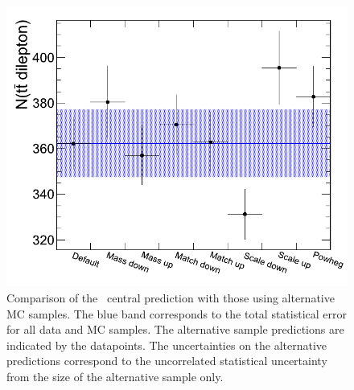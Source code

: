 \begin{figure}[hbt]
  \begin{center}
	\includegraphics[width=0.8\linewidth]{plots/n_dl_syst_comp.png}
	\caption{
	  \label{fig:ttllsyst}%
          Comparison of the \ttll\ central prediction with those using
          alternative MC samples. The blue band corresponds to the
          total statistical error for all data and MC samples. The
          alternative sample predictions are indicated by the
          datapoints. The uncertainties on the alternative predictions
          correspond to the uncorrelated statistical uncertainty from
          the size of the alternative sample only.}
      \end{center}
    \end{figure}



